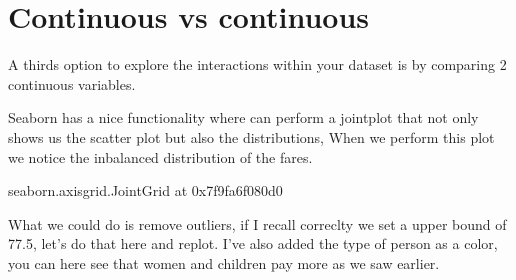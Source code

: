 \documentclass[letterpaper,10pt,english]{jupyterBook}
\begin{document}
\section{Continuous vs continuous}
\label{\detokenize{c5_data_exploration/bivariate_analysis:continuous-vs-continuous}}
\sphinxAtStartPar
A thirds option to explore the interactions within your dataset is by comparing 2 continuous variables.

\sphinxAtStartPar
Seaborn has a nice functionality where can perform a jointplot that not only shows us the scatter plot but also the distributions,
When we perform this plot we notice the inbalanced distribution of the fares.

\begin{sphinxVerbatim}[commandchars=\\\{\}]
  
\end{sphinxVerbatim}

\begin{sphinxVerbatim}[commandchars=\\\{\}]
\PYGZlt{}seaborn.axisgrid.JointGrid at 0x7f9fa6f080d0\PYGZgt{}
\end{sphinxVerbatim}

\noindent{}

\sphinxAtStartPar
What we could do is remove outliers, if I recall correclty we set a upper bound of 77.5, let’s do that here and replot.
I’ve also added the type of person as a color, you can here see that women and children pay more as we saw earlier.

\begin{sphinxVerbatim}[commandchars=\\\{\}]
\PYG{p}{[}\PYG{p}{]}   
\end{sphinxVerbatim}
\end{document}
